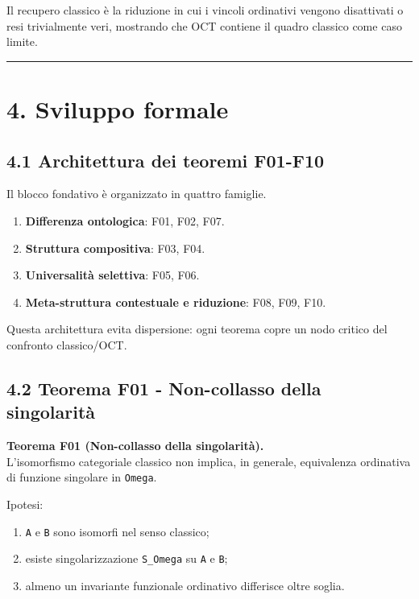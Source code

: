 Il recupero classico è la riduzione in cui i vincoli ordinativi vengono disattivati o resi trivialmente veri, mostrando che OCT contiene il quadro classico come caso limite.

\begin{center}\rule{0.5\linewidth}{0.5pt}\end{center}

\section{4. Sviluppo formale}

\subsection{4.1 Architettura dei teoremi F01-F10}

Il blocco fondativo è organizzato in quattro famiglie.

\begin{enumerate}
\def\labelenumi{\arabic{enumi}.}
\tightlist
\item
  \textbf{Differenza ontologica}: F01, F02, F07.
\item
  \textbf{Struttura compositiva}: F03, F04.
\item
  \textbf{Universalità selettiva}: F05, F06.
\item
  \textbf{Meta-struttura contestuale e riduzione}: F08, F09, F10.
\end{enumerate}

Questa architettura evita dispersione: ogni teorema copre un nodo critico del confronto classico/OCT.

\subsection{4.2 Teorema F01 - Non-collasso della singolarità}

\textbf{Teorema F01 (Non-collasso della singolarità).}\\
L'isomorfismo categoriale classico non implica, in generale, equivalenza ordinativa di funzione singolare in \texttt{Omega}.

Ipotesi:

\begin{enumerate}
\def\labelenumi{\arabic{enumi}.}
\tightlist
\item
  \texttt{A} e \texttt{B} sono isomorfi nel senso classico;
\item
  esiste singolarizzazione \texttt{S\_Omega} su \texttt{A} e \texttt{B};
\item
  almeno un invariante funzionale ordinativo differisce oltre soglia.
\end{enumerate}


